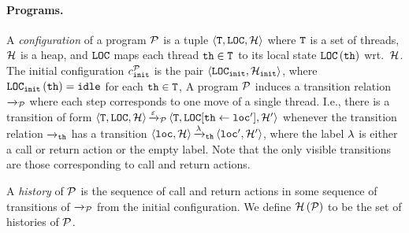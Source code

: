 \paragraph{Programs.}
A {\it configuration} of a program
${\mathcal P}$ is a tuple
$\left\langle{\tt T},{\tt LOC},{\mathcal H}\right\rangle$ where
${\tt T}$ is a set of threads,
${\mathcal H}$ is a heap, and
${\tt LOC}$
maps each thread ${\tt th}\in{\tt T}$ to its
local state ${\tt LOC}\left({\tt th}\right)$ wrt.\ ${\mathcal H}$.
%
%
The initial configuration
$c_{\tt init}^{{\mathcal P}}$ 
is the pair
$\left\langle{\tt LOC}_{\tt init},{\mathcal H}_{\tt init}\right\rangle$,
where
${\tt LOC}_{\tt init}\left({\tt th}\right)={\tt idle}$ for each
${\tt th}\in{\tt T}$,
%
A program ${\mathcal P}$ induces a transition relation
${\xrightarrow{}{}}_{\!\!{\mathcal P}}$ where each step corresponds to one move of a single thread.
I.e., 
there is a transition of form
$\left\langle{\tt T},{\tt LOC},{\mathcal H}\right\rangle
{\xrightarrow{\varepsilon}{}}_{\!\!{\mathcal P}}
\left\langle{\tt T},{\tt LOC}[{\tt th}\leftarrow{\tt loc}'],{\mathcal H}'\right\rangle$
whenever the transition relation ${\xrightarrow{}{}}_{\!\!{\tt th}}$ has a transition
$\left\langle{\tt loc},{\mathcal H}\right\rangle{\xrightarrow{\lambda}{}}_{\!\!{\tt th}}\left\langle{\tt loc}',{\mathcal H}'\right\rangle$,
where the label $\lambda$ is either a call or return action or the empty label.
%
Note that the only visible transitions are those
corresponding to call and return actions.

A {\it history} of ${\mathcal P}$ is the sequence of call and return actions in
some sequence of transitions of ${\xrightarrow{}{}}_{\!\!{\mathcal P}}$ from the initial configuration.
We define ${\mathcal H}\left({\mathcal P}\right)$ to be the set of histories of ${\mathcal P}$.

